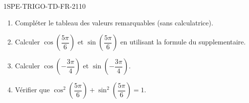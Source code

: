 \begin{exercice}{1SPE-TRIGO-TD-FR-2}{1}{10}
\begin{enumerate}
  \item Compléter le tableau des valeurs remarquables (sans calculatrice).
  \item Calculer $\cos\!\left(\dfrac{5\pi}{6}\right)$ et $\sin\!\left(\dfrac{5\pi}{6}\right)$ en utilisant la formule du supplementaire.
  \item Calculer $\cos\!\left(-\dfrac{3\pi}{4}\right)$ et $\sin\!\left(-\dfrac{3\pi}{4}\right)$.
  \item Vérifier que $\cos^2\!\left(\dfrac{5\pi}{6}\right) + \sin^2\!\left(\dfrac{5\pi}{6}\right) = 1$.
\end{enumerate}
\end{exercice}

